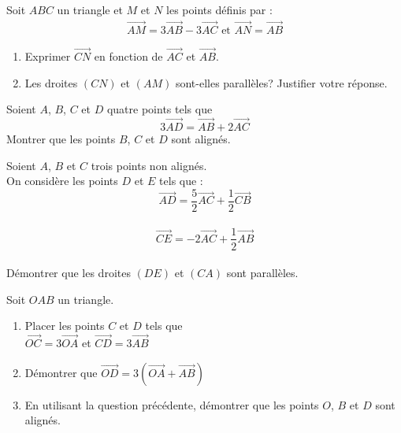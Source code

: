 \begin{exercice}

Soit $ABC$ un triangle et $M$ et $N$ les points définis par :
\begin{align*}
\overrightarrow{AM}=3\overrightarrow{AB}-3\overrightarrow{AC} \mbox{ et } \overrightarrow{AN}=\overrightarrow{AB}
\end{align*}
\begin{enumerate}
\item Exprimer $\overrightarrow{CN}$ en fonction de $\overrightarrow{AC}$ et $\overrightarrow{AB}$.
\item Les droites $(CN)$ et $(AM)$ sont-elles parallèles? Justifier votre réponse.
\end{enumerate}

\end{exercice} 


\begin{exercice}

Soient $A$, $B$, $C$ et $D$ quatre points tels que $$3\overrightarrow{AD}=\overrightarrow{AB}+2\overrightarrow{AC}$$
Montrer que les points $B$, $C$ et $D$ sont alignés.

\end{exercice} 

\begin{exercice}

Soient $A$, $B$ et $C$ trois points non alignés.\\
On considère les points $D$ et $E$ tels que :\\
$$\overrightarrow{AD}=\frac{5}{2}\overrightarrow{AC}+\frac{1}{2}\overrightarrow{CB}$$\\
$$\overrightarrow{CE}=-2\overrightarrow{AC}+\frac{1}{2}\overrightarrow{AB}$$\\
Démontrer que les droites $(DE)$ et $(CA)$ sont parallèles.

\end{exercice} 

\begin{exercice}
Soit $OAB$ un triangle.
\begin{enumerate}
	\item Placer les points $C$ et $D$ tels que \\
	$\overrightarrow{OC}=3\overrightarrow{OA}$ et $\overrightarrow{CD}=3\overrightarrow{AB}$
	\item Démontrer que $\overrightarrow{OD}=3(\overrightarrow{OA}+\overrightarrow{AB})$
	\item En utilisant la question précédente, démontrer que les points $O$, $B$ et $D$ sont alignés.
\end{enumerate}
\end{exercice} 

